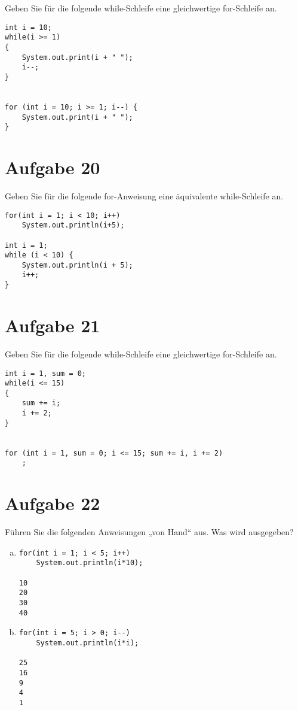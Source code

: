 \documentclass[10pt, oneside]{article}
\begin{document}
Geben Sie für die folgende while-Schleife eine gleichwertige for-Schleife an.

\begin{verbatim}
int i = 10;
while(i >= 1)
{
    System.out.print(i + " ");
    i--;
}


for (int i = 10; i >= 1; i--) {
    System.out.print(i + " ");
}
\end{verbatim}

\section{Aufgabe 20}

Geben Sie für die folgende for-Anweisung eine äquivalente while-Schleife an.

\begin{verbatim}
for(int i = 1; i < 10; i++)
    System.out.println(i+5);

int i = 1;
while (i < 10) {
    System.out.println(i + 5);
    i++;
}
\end{verbatim}

\section{Aufgabe 21}

Geben Sie für die folgende while-Schleife eine gleichwertige for-Schleife an.

\begin{verbatim}
int i = 1, sum = 0;
while(i <= 15)
{
    sum += i;
    i += 2;
}


for (int i = 1, sum = 0; i <= 15; sum += i, i += 2)
    ;
\end{verbatim}

\pagebreak
\section{Aufgabe 22}

Führen Sie die folgenden Anweisungen „von Hand“ aus. Was wird ausgegeben?

\begin{enumerate}[(a)]
\item
\begin{verbatim}
for(int i = 1; i < 5; i++)
    System.out.println(i*10);

10
20
30
40
\end{verbatim}

\item
\begin{verbatim}
for(int i = 5; i > 0; i--)
    System.out.println(i*i);

25
16
9
4
1
\end{verbatim}
\end{enumerate}
\end{document}

